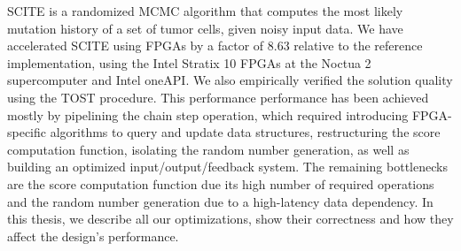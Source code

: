 \acs{SCITE} is a randomized \acl{MCMC} algorithm that computes the most likely mutation history of a set of tumor cells, given noisy input data. We have accelerated \acs{SCITE} using \acp{FPGA} by a factor of 8.63 relative to the reference implementation, using the Intel Stratix 10 \acp{FPGA} at the Noctua 2 supercomputer and Intel oneAPI. We also empirically verified the solution quality using the \acl{TOST} procedure. This performance performance has been achieved mostly by pipelining the chain step operation, which required introducing \ac{FPGA}-specific algorithms to query and update data structures, restructuring the score computation function, isolating the random number generation, as well as building an optimized input/output/feedback system. The remaining bottlenecks are the score computation function due its high number of required operations and the random number generation due to a high-latency data dependency. In this thesis, we describe all our optimizations, show their correctness and how they affect the design's performance.
